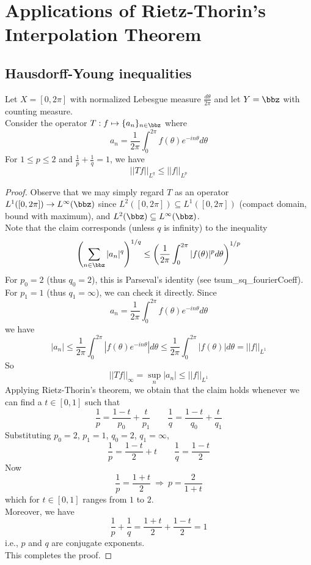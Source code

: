   \section{Applications of Rietz-Thorin's Interpolation Theorem}

  \subsection{Hausdorff-Young inequalities}

  \begin{lemma}
    \label{lem:hausdorff_young}
    \uses{}
    \lean{}
    Let $X=[0,2\pi]$ with normalized Lebesgue measure $\frac{d\theta}{2\pi}$ and let $Y=\bbz$ with counting measure.\\
    Consider the operator $T: f \mapsto \{a_n\}_{n\in \bbz}$ where
    \[ a_n = \frac{1}{2\pi} \int_0^{2\pi} f(\theta) e^{-in\theta} d\theta \]
    For $1\leq p\leq 2$ and $\frac{1}{p}+\frac{1}{q}=1$, we have
    \[ ||Tf||_{L^q} \leq ||f||_{L^p} \]

    \end{lemma}
      \begin{proof}
      Observe that we may simply regard $T$ as an operator $L^1([0, 2\pi]) \to L^{\infty}(\bbz)$ since $L^2([0, 2\pi]) \subseteq L^1([0, 2\pi])$ (compact domain, bound with maximum), and $L^2(\bbz) \subseteq L^{\infty}(\bbz)$.\\
      Note that the claim corresponds (unless $q$ is infinity) to the inequality
      \[ \left(\sum_{n \in \bbz} |a_n|^q \right)^{1/q} \leq \left(\frac{1}{2\pi} \int_0^{2\pi} |f(\theta)|^p d\theta\right)^{1/p}\]
      For $p_0=2$ (thus $q_0=2$), this is Parseval's identity (see tsum\_sq\_fourierCoeff).\\
      For $p_1=1$ (thus $q_1=\infty$), we can check it directly. Since
      \[ a_n = \frac{1}{2\pi} \int_0^{2\pi} f(\theta) e^{-in\theta} d\theta \]
      we have
      \[ |a_n| \leq \frac{1}{2\pi} \int_0^{2\pi} |f(\theta) e^{-in\theta}| d\theta \leq \frac{1}{2\pi} \int_0^{2\pi} |f(\theta)| d\theta = ||f||_{L^1}  \]
      So
      \[ ||Tf||_{\infty} = \sup_n |a_n| \leq ||f||_{L^1}\]
      Applying Rietz-Thorin's theorem, we obtain that the claim holds whenever we can find a $t\in [0,1]$ such that
      \[\frac{1}{p} = \frac{1-t}{p_0} + \frac{t}{p_1} \qquad \frac{1}{q} = \frac{1-t}{q_0} + \frac{t}{q_1} \]
      Substituting $p_0=2$, $p_1=1$, $q_0=2$, $q_1=\infty$,
      \[\frac{1}{p} = \frac{1-t}{2} + t \qquad \frac{1}{q} = \frac{1-t}{2} \]
      Now
      \[ \frac{1}{p} = \frac{1+t}{2} \ \Rightarrow \ p = \frac{2}{1+t} \]
      which for $t\in [0,1]$ ranges from $1$ to $2$.\\
      Moreover, we have
      \[ \frac{1}{p} + \frac{1}{q} = \frac{1+t}{2} + \frac{1-t}{2} = 1 \]
      i.e., $p$ and $q$ are conjugate exponents.\\
      This completes the proof.
    \end{proof}

